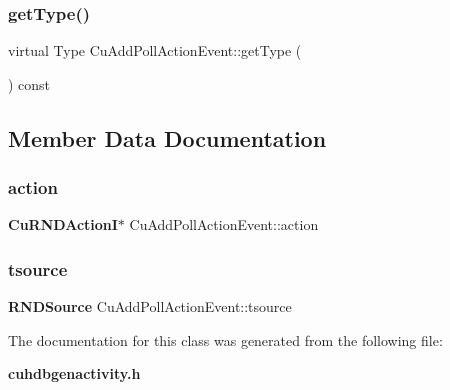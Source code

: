 \subsubsection{getType()}
{\footnotesize\ttfamily virtual Type Cu\+Add\+Poll\+Action\+Event\+::get\+Type (\begin{DoxyParamCaption}{ }\end{DoxyParamCaption}) const\hspace{0.3cm}{\ttfamily [virtual]}}



\subsection{Member Data Documentation}
\mbox{\label{classCuAddPollActionEvent_a91e93896f8d53e222187af05a881d957}} 
\subsubsection{action}
{\footnotesize\ttfamily \textbf{ Cu\+R\+N\+D\+ActionI}$\ast$ Cu\+Add\+Poll\+Action\+Event\+::action}

\mbox{\label{classCuAddPollActionEvent_a6853d22eb9d6a60265f84100a8808a7b}} 
\subsubsection{tsource}
{\footnotesize\ttfamily \textbf{ R\+N\+D\+Source} Cu\+Add\+Poll\+Action\+Event\+::tsource}



The documentation for this class was generated from the following file\+:\begin{DoxyCompactItemize}
\item 
\textbf{ cuhdbgenactivity.\+h}\end{DoxyCompactItemize}
